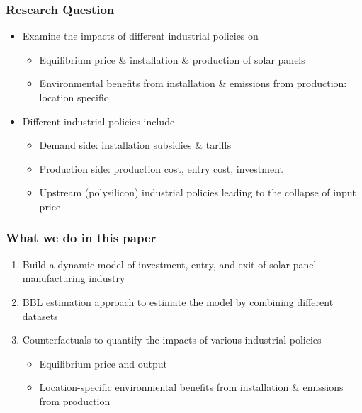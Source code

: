 \documentclass[xcolor=dvipsnames,envcountsect]{beamer}
\begin{document}
\begin{frame}[label=RQ]
	\frametitle{Research Question}
        \begin{itemize}

        \item Examine the impacts of different industrial policies on
            \begin{itemize}
                \item Equilibrium price \& installation \& production of solar panels
                \item Environmental benefits from installation \& emissions from production: location specific
            \end{itemize}
         \pause
        \item Different industrial policies include
            \begin{itemize}
                \item Demand side: installation subsidies \& tariffs
                \item Production side: production cost, entry cost, investment
                \item Upstream (polysilicon) industrial policies leading to the collapse of input price
            \end{itemize}
        \end{itemize}
\end{frame}

\begin{frame}[label=RQ]
	\frametitle{What we do in this paper}
        \begin{enumerate}
        \item Build a dynamic model of investment, entry, and exit of solar panel manufacturing industry
        \pause
       \item BBL estimation approach to estimate the model by combining different datasets
       \pause
       \item Counterfactuals to quantify the impacts of various industrial policies
       \begin{itemize}
           \item Equilibrium price and output
           \item Location-specific environmental benefits from installation \& emissions from production
       \end{itemize}

        \end{enumerate}
\end{frame}
\end{document}
